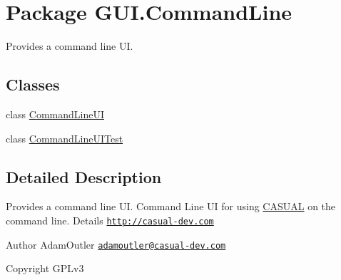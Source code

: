 \hypertarget{namespace_g_u_i_1_1_command_line}{\section{Package G\-U\-I.\-Command\-Line}
\label{namespace_g_u_i_1_1_command_line}
}


Provides a command line U\-I.  


\subsection*{Classes}
\begin{DoxyCompactItemize}
\item 
class \hyperlink{class_g_u_i_1_1_command_line_1_1_command_line_u_i}{Command\-Line\-U\-I}
\item 
class \hyperlink{class_g_u_i_1_1_command_line_1_1_command_line_u_i_test}{Command\-Line\-U\-I\-Test}
\end{DoxyCompactItemize}


\subsection{Detailed Description}
Provides a command line U\-I. Command Line U\-I for using \hyperlink{namespace_c_a_s_u_a_l}{C\-A\-S\-U\-A\-L} on the command line. Details \href{http://casual-dev.com}{\tt http\-://casual-\/dev.\-com} \begin{DoxyAuthor}{Author}
Adam\-Outler \href{mailto:adamoutler@casual-dev.com}{\tt adamoutler@casual-\/dev.\-com} 
\end{DoxyAuthor}
\begin{DoxyCopyright}{Copyright}
G\-P\-Lv3 
\end{DoxyCopyright}
